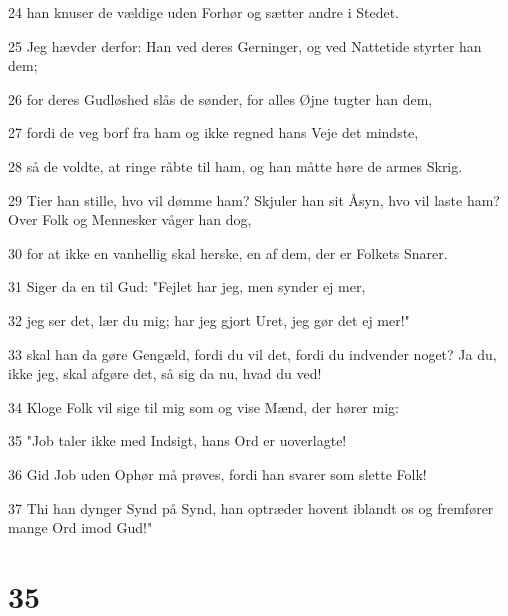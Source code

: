 \par 24 han knuser de vældige uden Forhør og sætter andre i Stedet.
\par 25 Jeg hævder derfor: Han ved deres Gerninger, og ved Nattetide styrter han dem;
\par 26 for deres Gudløshed slås de sønder, for alles Øjne tugter han dem,
\par 27 fordi de veg borf fra ham og ikke regned hans Veje det mindste,
\par 28 så de voldte, at ringe råbte til ham, og han måtte høre de armes Skrig.
\par 29 Tier han stille, hvo vil dømme ham? Skjuler han sit Åsyn, hvo vil laste ham? Over Folk og Mennesker våger han dog,
\par 30 for at ikke en vanhellig skal herske, en af dem, der er Folkets Snarer.
\par 31 Siger da en til Gud: "Fejlet har jeg, men synder ej mer,
\par 32 jeg ser det, lær du mig; har jeg gjort Uret, jeg gør det ej mer!"
\par 33 skal han da gøre Gengæld, fordi du vil det, fordi du indvender noget? Ja du, ikke jeg, skal afgøre det, så sig da nu, hvad du ved!
\par 34 Kloge Folk vil sige til mig som og vise Mænd, der hører mig:
\par 35 "Job taler ikke med Indsigt, hans Ord er uoverlagte!
\par 36 Gid Job uden Ophør må prøves, fordi han svarer som slette Folk!
\par 37 Thi han dynger Synd på Synd, han optræder hovent iblandt os og fremfører mange Ord imod Gud!"

\chapter{35}

